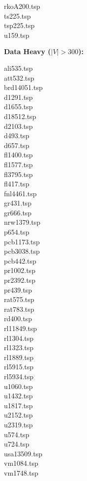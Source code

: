 \documentclass[11pt, english, openany]{report}
\begin{document}
\begin{appendices}
\begin{multicols}{5}
				rkoA200.tsp \\
				ts225.tsp \\
				tsp225.tsp \\
				u159.tsp \\
		\end{multicols}
		\textbf{Data Heavy ($|V| > 300$):}
		\begin{multicols}{5}
			ali535.tsp \\
			att532.tsp \\
			brd14051.tsp \\
			d1291.tsp \\
			d1655.tsp \\
			d18512.tsp \\
			d2103.tsp \\
			d493.tsp \\
			d657.tsp \\
			fl1400.tsp \\
			fl1577.tsp \\
			fl3795.tsp \\
			fl417.tsp \\
			fnl4461.tsp \\
			gr431.tsp \\
			gr666.tsp \\
			nrw1379.tsp \\
			p654.tsp \\
			pcb1173.tsp \\
			pcb3038.tsp \\
			pcb442.tsp \\
			pr1002.tsp \\
			pr2392.tsp \\
			pr439.tsp \\
			rat575.tsp \\
			rat783.tsp \\
			rd400.tsp \\
			rl11849.tsp \\
			rl1304.tsp \\
			rl1323.tsp \\
			rl1889.tsp \\
			rl5915.tsp \\
			rl5934.tsp \\
			u1060.tsp \\
			u1432.tsp \\
			u1817.tsp \\
			u2152.tsp \\
			u2319.tsp \\
			u574.tsp \\
			u724.tsp \\
			usa13509.tsp \\
			vm1084.tsp \\
			vm1748.tsp
		\end{multicols}
		

\end{appendices}
\end{document}
